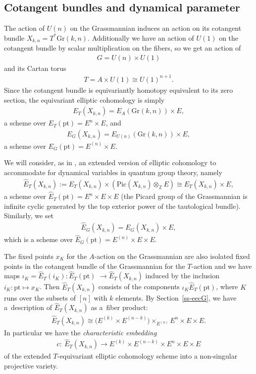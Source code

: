 \documentclass[10pt,a4paper]{amsart}
\numberwithin{equation}{section}
\begin{document}
\subsection{Cotangent bundles and dynamical parameter}\label{ss-Extended}
The action of $U(n)$ on the Grassmannian induces an action on its cotangent bundle $X_{k,n}=T^*\mathrm{Gr}(k,n)$. Additionally we have an action of $U(1)$ on the cotangent bundle by scalar multiplication on the fibers, so we get an action of
\begin{gather*}
 G=U(n)\times U(1)
\end{gather*}
and its Cartan torus
\begin{gather*}
 T=A\times U(1)\cong U(1)^{n+1}.
\end{gather*}
Since the cotangent bundle is equivariantly homotopy equivalent to its zero section, the equivariant elliptic cohomology is simply
\begin{gather*}
 E_T(X_{k,n})=E_A(\mathrm{Gr}(k,n))\times E,
\end{gather*}
a scheme over $E_T(\mathrm{pt})=E^{n}\times E$, and
\begin{gather*}
 E_G(X_{k,n})=E_{U(n)}(\mathrm{Gr}(k,n))\times E,
\end{gather*}
a scheme over $E_G(\mathrm{pt})=E^{(n)}\times E$.

We will consider, as in \cite{AO}, an extended version of elliptic cohomology to accommodate for dynamical variables in quantum group theory, namely
\begin{gather*}
 \hat E_T(X_{k,n}):=E_T(X_{k,n})\times (\mathrm{Pic}(X_{k,n})\otimes_{\mathbb Z}E)\cong E_T(X_{k,n})\times E,
\end{gather*}
a scheme over $\hat E_T(\mathrm{pt})=E^n\times E\times E$ (the Picard group of the Grassmannian is infinite cyclic generated by the top exterior power of the tautological bundle). Similarly, we set
\begin{gather*}
 \hat E_G(X_{k,n})=E_G(X_{k,n})\times E,
\end{gather*}
which is a scheme over $\hat E_G(\mathrm{pt})=E^{(n)}\times E\times E$.

The fixed points $x_K$ for the $A$-action on the Grassmannian are also isolated fixed points in the cotangent bundle of the Grassmannian for the $T$-action and we have maps $\iota_K=\hat E_T(i_K)\colon \hat E_T(\mathrm{pt})$ $\to \hat E_T(X_{k,n})$ induced by the inclusion $i_K\colon \mathrm{pt} \mapsto x_K$. Then $\hat E_T(X_{k,n})$ consists of the components $\iota_K\hat E_T(\mathrm{pt})$, where $K$ runs over the subsets of $[n]$ with $k$ elements. By Section~\ref{ss-eecG}, we have a~description of $\hat E_T(X_{k,n})$ as a~fiber product:
\begin{gather*}
\hat E_T(X_{k,n})\cong \big(E^{(k)}\times E^{(n-k)}\big)\times_{E^{(n)}}E^n\times E\times E.
\end{gather*}
In particular we have the {\em characteristic embedding}
\begin{gather}\label{e-ce}
c\colon \ \hat E_T(X_{k,n})\to E^{(k)}\times E^{(n-k)}\times E^{n}\times E\times E
\end{gather}
of the extended $T$-equivariant elliptic cohomology scheme into a non-singular projective variety.
\end{document}
